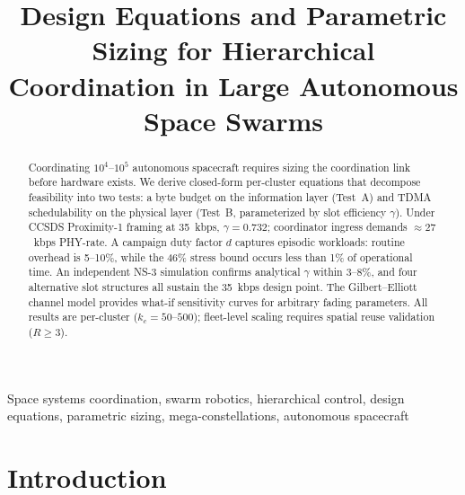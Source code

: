 \documentclass[journal]{IEEEtran}
\begin{document}
\title{Design Equations and Parametric Sizing for Hierarchical Coordination in Large Autonomous Space Swarms}

\author{
}


\maketitle

\begin{abstract}
Coordinating $10^4$--$10^5$ autonomous spacecraft requires sizing the coordination link before hardware exists. We derive closed-form per-cluster equations that decompose feasibility into two tests: a byte budget on the information layer (Test~A) and TDMA schedulability on the physical layer (Test~B, parameterized by slot efficiency $\gamma$). Under CCSDS Proximity-1 framing at 35~kbps, $\gamma = 0.732$; coordinator ingress demands ${\approx}27$~kbps PHY-rate. A campaign duty factor $d$ captures episodic workloads: routine overhead is 5--10\%, while the 46\% stress bound occurs less than 1\% of operational time. An independent NS-3 simulation confirms analytical $\gamma$ within 3--8\%, and four alternative slot structures all sustain the 35~kbps design point. The Gilbert--Elliott channel model provides what-if sensitivity curves for arbitrary fading parameters. All results are per-cluster ($k_c = 50$--$500$); fleet-level scaling requires spatial reuse validation ($R \geq 3$).
\end{abstract}

\begin{IEEEkeywords}
Space systems coordination, swarm robotics, hierarchical control, design equations, parametric sizing, mega-constellations, autonomous spacecraft
\end{IEEEkeywords}

\section{Introduction}
\end{document}
